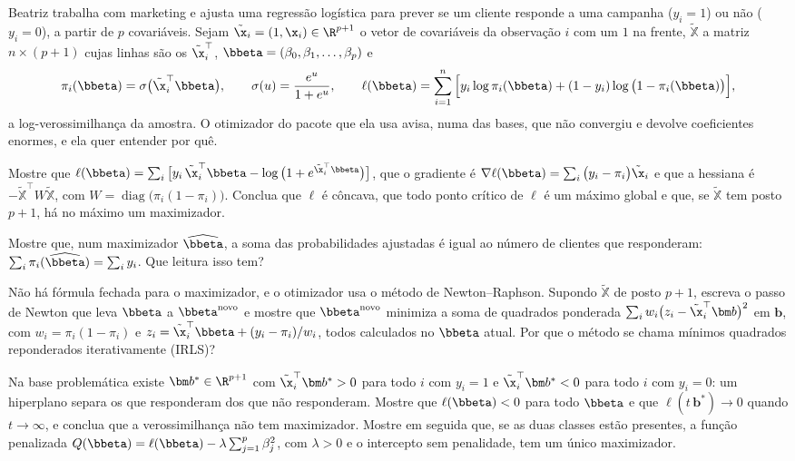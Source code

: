 Beatriz trabalha com marketing e ajusta uma regressão logística para prever se um cliente
responde a uma campanha ($y_i=1$) ou não ($y_i=0$), a partir de $p$ covariáveis. Sejam
$\tilde\x_i=(1,\x_i)\in\R^{p+1}$ o vetor de covariáveis da observação $i$ com um $1$ na
frente, $\tilde{\mathbb X}$ a matriz $n\times(p+1)$ cujas linhas são os $\tilde\x_i^\top$,
$\bbeta=(\beta_0,\beta_1,\dots,\beta_p)$ e
\[
  \pi_i(\bbeta)=\sigma\big(\tilde\x_i^\top\bbeta\big),\qquad
  \sigma(u)=\frac{e^u}{1+e^u},\qquad
  \ell(\bbeta)=\sum_{i=1}^n\Big[y_i\log\pi_i(\bbeta)+(1-y_i)\log\big(1-\pi_i(\bbeta)\big)\Big],
\]
a log-verossimilhança da amostra. O otimizador do pacote que ela usa avisa, numa das bases,
que não convergiu e devolve coeficientes enormes, e ela quer entender por quê.
\begin{itens}
  \item {} Mostre que
        $\ell(\bbeta)=\sum_i\big[y_i\,\tilde\x_i^\top\bbeta-\log\big(1+e^{\tilde\x_i^\top\bbeta}\big)\big]$,
        que o gradiente é $\nabla\ell(\bbeta)=\sum_i\big(y_i-\pi_i\big)\tilde\x_i$ e que a
        hessiana é $-\tilde{\mathbb X}^\top W\tilde{\mathbb X}$, com
        $W=\operatorname{diag}\big(\pi_i(1-\pi_i)\big)$. Conclua que $\ell$ é côncava, que
        todo ponto crítico de $\ell$ é um máximo global e que, se $\tilde{\mathbb X}$
        tem posto $p+1$, há no máximo um maximizador.
  \item {} Mostre que, num maximizador $\widehat\bbeta$, a soma das probabilidades
        ajustadas é igual ao número de clientes que responderam:
        $\sum_i\pi_i(\widehat\bbeta)=\sum_iy_i$. Que leitura isso tem?
  \item {} Não há fórmula fechada para o maximizador, e o otimizador usa o método de
        Newton--Raphson. Supondo $\tilde{\mathbb X}$ de posto $p+1$, escreva o passo de
        Newton que leva $\bbeta$ a $\bbeta^{\mathrm{novo}}$ e mostre que
        $\bbeta^{\mathrm{novo}}$ minimiza a soma de quadrados ponderada
        $\sum_iw_i\big(z_i-\tilde\x_i^\top\bm b\big)^2$ em $\bm b$, com
        $w_i=\pi_i(1-\pi_i)$ e $z_i=\tilde\x_i^\top\bbeta+(y_i-\pi_i)/w_i$, todos
        calculados no $\bbeta$ atual. Por que o método se chama mínimos quadrados
        reponderados iterativamente (IRLS)?
  \item {} Na base problemática existe $\bm b^*\in\R^{p+1}$ com
        $\tilde\x_i^\top\bm b^*>0$ para todo $i$ com $y_i=1$ e $\tilde\x_i^\top\bm b^*<0$
        para todo $i$ com $y_i=0$: um hiperplano separa os que responderam dos que não
        responderam. Mostre que $\ell(\bbeta)<0$ para todo $\bbeta$ e que
        $\ell(t\,\bm b^*)\to0$ quando $t\to\infty$, e conclua que a verossimilhança não
        tem maximizador. Mostre em seguida que, se as duas classes estão presentes, a
        função penalizada $Q(\bbeta)=\ell(\bbeta)-\lambda\sum_{j=1}^p\beta_j^2$, com
        $\lambda>0$ e o intercepto sem penalidade, tem um único maximizador.
\end{itens}


